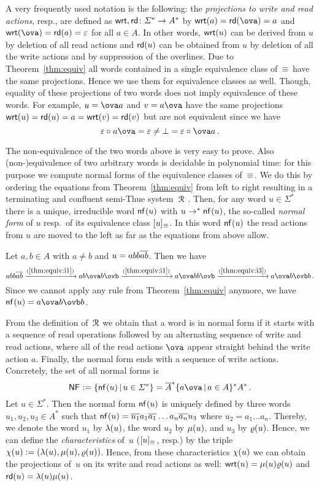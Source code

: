 A very frequently used notation is the following: the \emph{projections to write and read actions}, resp., are defined as $\mathsf{wrt},\mathsf{rd}\colon\varSigma^*\to A^*$ by $\wrt{a}=\rd{\ova}=a$ and $\wrt{\ova}=\rd{a}=\varepsilon$ for all $a\in A$. In other words, $\mathsf{wrt}(u)$ can be derived from $u$ by deletion of all read actions and $\mathsf{rd}(u)$ can be obtained from $u$ by deletion of all the write actions and by suppression of the overlines. Due to Theorem~\ref{thm:equiv} all words contained in a single equivalence class of~$\equiv_{}$ have the same projections. Hence we use them for equivalence classes as well. Though, equality of these projections of two words does not imply equivalence of these words. For example, $u=\ova a$ and $v=a\ova$ have the same projections $\mathsf{wrt}(u)=\mathsf{rd}(u)=a=\mathsf{wrt}(v)=\mathsf{rd}(v)$ but are not equivalent since we have
\[\varepsilon\opx a\ova=\varepsilon\neq\bot=\varepsilon\opx\ova a\,.\]

The non-equivalence of the two words above is very easy to prove. Also (non-)equivalence of two arbitrary words is decidable in polynomial time: for this purpose we compute normal forms of the equivalence classes of~$\equiv_{}$. We do this by ordering the equations from Theorem~\ref{thm:equiv} from left to right resulting in a terminating and confluent semi-Thue system~$\mathcal{R}_{}$ \cite[Lemma~4.1]{HusKZ17}. Then, for any word $u\in\varSigma^*$ there is a unique, irreducible word $\mathsf{nf}_{}(u)$ with $u\to^*\mathsf{nf}_{}(u)$, the so-called \emph{normal form} of $u$ resp.\ of its equivalence class $[u]_{\equiv_{}}$. In this word $\mathsf{nf}_{}(u)$ the read actions from $u$ are moved to the left as far as the equations from above allow.

\begin{example}\label{ex:nfx}
	Let $a,b\in A$ with $a\neq b$ and $u=abb\overline{ab}$. Then we have
	\[
	abb\ov{ab}\xrightarrow{(\ref{thm:equiv:i1})} ab\ova b\ovb\xrightarrow{(\ref{thm:equiv:i1})} a\ova bb\ovb\xrightarrow{(\ref{thm:equiv:i3})} a\ova b\ovb b\,.
	\]
	Since we cannot apply any rule from Theorem~\ref{thm:equiv} anymore, we have $\nfx{u}=a\ova b\ovb b$.
\end{example}

From the definition of~$\mathcal{R}_{}$ we obtain that a word is in normal form if it starts with a sequence of read operations followed by an alternating sequence of write and read actions, where all of the read actions $\ova$ appear straight behind the write action $a$. Finally, the normal form ends with a sequence of write actions. Concretely, the set of all normal forms is
\[\NFx:=\{\nfx{u}\,|\,u\in\varSigma^*\}=\ov{A}^*\{a\ova\,|\,a\in A\}^*A^*\,.\]
Let $u\in\varSigma^*$. Then the normal form $\mathsf{nf}_{}(u)$ is uniquely defined by three words $u_1,u_2,u_3\in A^*$ such that $\mathsf{nf}_{}(u)=\overline{u_1}a_1\overline{a_1}\dots a_n\overline{a_n}u_3$ where $u_2=a_1\dots a_n$. Thereby, we denote the word $u_1$ by $\lambda(u)$, the word $u_2$ by $\mu(u)$, and $u_3$ by $\varrho(u)$. Hence, we can define the \emph{characteristics} of~$u$ ($[u]_{\equiv_{}}$, resp.) by the triple 
$\chi(u):=(\lambda(u),\mu(u),\varrho(u))$.
Hence, from these characteristics $\chi(u)$ we can obtain the projections of~$u$ on its write and read actions as well: $\mathsf{wrt}(u)=\mu(u)\varrho(u)$ and $\mathsf{rd}(u)=\lambda(u)\mu(u)$.

